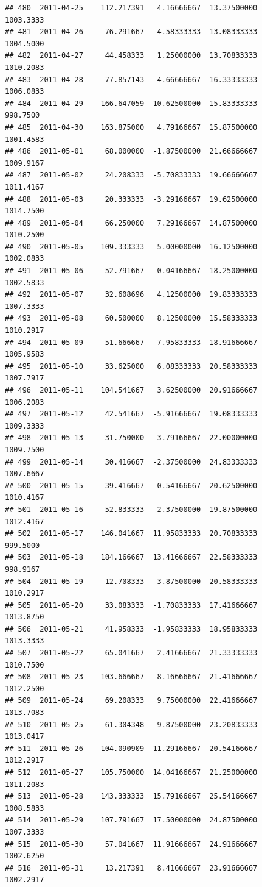 \documentclass[
]{article}
\begin{document}
\begin{verbatim}
## 480  2011-04-25    112.217391   4.16666667  13.37500000    1003.3333
## 481  2011-04-26     76.291667   4.58333333  13.08333333    1004.5000
## 482  2011-04-27     44.458333   1.25000000  13.70833333    1010.2083
## 483  2011-04-28     77.857143   4.66666667  16.33333333    1006.0833
## 484  2011-04-29    166.647059  10.62500000  15.83333333     998.7500
## 485  2011-04-30    163.875000   4.79166667  15.87500000    1001.4583
## 486  2011-05-01     68.000000  -1.87500000  21.66666667    1009.9167
## 487  2011-05-02     24.208333  -5.70833333  19.66666667    1011.4167
## 488  2011-05-03     20.333333  -3.29166667  19.62500000    1014.7500
## 489  2011-05-04     66.250000   7.29166667  14.87500000    1010.2500
## 490  2011-05-05    109.333333   5.00000000  16.12500000    1002.0833
## 491  2011-05-06     52.791667   0.04166667  18.25000000    1002.5833
## 492  2011-05-07     32.608696   4.12500000  19.83333333    1007.3333
## 493  2011-05-08     60.500000   8.12500000  15.58333333    1010.2917
## 494  2011-05-09     51.666667   7.95833333  18.91666667    1005.9583
## 495  2011-05-10     33.625000   6.08333333  20.58333333    1007.7917
## 496  2011-05-11    104.541667   3.62500000  20.91666667    1006.2083
## 497  2011-05-12     42.541667  -5.91666667  19.08333333    1009.3333
## 498  2011-05-13     31.750000  -3.79166667  22.00000000    1009.7500
## 499  2011-05-14     30.416667  -2.37500000  24.83333333    1007.6667
## 500  2011-05-15     39.416667   0.54166667  20.62500000    1010.4167
## 501  2011-05-16     52.833333   2.37500000  19.87500000    1012.4167
## 502  2011-05-17    146.041667  11.95833333  20.70833333     999.5000
## 503  2011-05-18    184.166667  13.41666667  22.58333333     998.9167
## 504  2011-05-19     12.708333   3.87500000  20.58333333    1010.2917
## 505  2011-05-20     33.083333  -1.70833333  17.41666667    1013.8750
## 506  2011-05-21     41.958333  -1.95833333  18.95833333    1013.3333
## 507  2011-05-22     65.041667   2.41666667  21.33333333    1010.7500
## 508  2011-05-23    103.666667   8.16666667  21.41666667    1012.2500
## 509  2011-05-24     69.208333   9.75000000  22.41666667    1013.7083
## 510  2011-05-25     61.304348   9.87500000  23.20833333    1013.0417
## 511  2011-05-26    104.090909  11.29166667  20.54166667    1012.2917
## 512  2011-05-27    105.750000  14.04166667  21.25000000    1011.2083
## 513  2011-05-28    143.333333  15.79166667  25.54166667    1008.5833
## 514  2011-05-29    107.791667  17.50000000  24.87500000    1007.3333
## 515  2011-05-30     57.041667  11.91666667  24.91666667    1002.6250
## 516  2011-05-31     13.217391   8.41666667  23.91666667    1002.2917

\end{verbatim}
\end{document}
